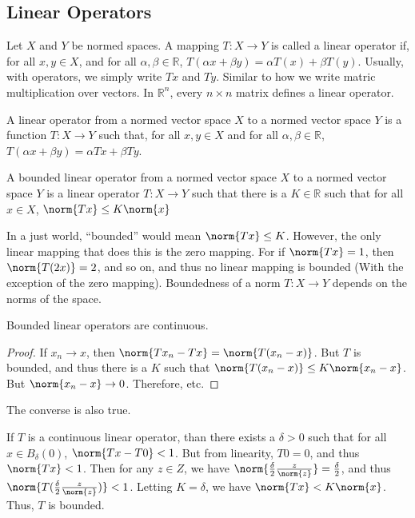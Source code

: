     \subsection{Linear Operators}
        Let $X$ and $Y$ be normed spaces. A mapping
        $T:X\rightarrow{Y}$ is called a linear operator if, for
        all $x,y\in{X}$, and for all $\alpha,\beta\in\mathbb{R}$,
        $T(\alpha{x}+\beta{y})=\alpha{T(x)}+\beta{T(y)}$. Usually, with
        operators, we simply write $Tx$ and $Ty$. Similar to how
        we write matric multiplication over vectors. In $\mathbb{R}^{n}$,
        every $n\times{n}$ matrix defines a linear operator.
        \begin{definition}
            A linear operator from a normed vector space $X$ to
            a normed vector space $Y$ is a function
            $T:X\rightarrow{Y}$ such that, for all $x,y\in{X}$
            and for all $\alpha,\beta\in\mathbb{R}$,
            $T(\alpha{x}+\beta{y})=\alpha{Tx}+\beta{Ty}$.
        \end{definition}
        \begin{definition}
            A bounded linear operator from a normed vector space
            $X$ to a normed vector space $Y$ is a linear operator
            $T:X\rightarrow{Y}$ such that there is a $K\in\mathbb{R}$
            such that for all $x\in{X}$, $\norm{Tx}\leq{K}\norm{x}$
        \end{definition}
        In a just world, ``bounded'' would mean
        $\norm{Tx}\leq{K}$. However, the only linear mapping that does
        this is the zero mapping. For if $\norm{Tx}=1$,
        then $\norm{T(2x)}=2$, and so on, and thus no linear mapping
        is bounded (With the exception of the zero mapping).
        Boundedness of a norm $T:X\rightarrow{Y}$ depends on
        the norms of the space.
        \begin{theorem}
            Bounded linear operators are continuous.
        \end{theorem}
        \begin{proof}
            If $x_{n}\rightarrow{x}$, then
            $\norm{Tx_{n}-Tx}=\norm{T(x_{n}-x)}$. But
            $T$ is bounded, and thus there is a $K$ such that
            $\norm{T(x_{n}-x)}\leq{K}\norm{x_{n}-x}$. But
            $\norm{x_{n}-x}\rightarrow{0}$. Therefore, etc.
        \end{proof}
        The converse is also true.
        \begin{theorem}
            If $T$ is a continuous linear operator,
            than there exists a $\delta>0$ such that for
            all $x\in{B}_{\delta}(0)$,
            $\norm{Tx-T0}<1$. But from linearity,
            $T0=0$, and thus $\norm{Tx}<1$. Then for any
            $z\in{Z}$, we have
            $\norm{\frac{\delta}{2}\frac{z}{\norm{z}}}=\frac{\delta}{2}$,
            and thus $\norm{T(\frac{\delta}{2}\frac{z}{\norm{z}})}<1$.
            Letting $K=\delta$, we have
            $\norm{Tx}<K\norm{x}$. Thus, $T$ is bounded.
        \end{theorem}
